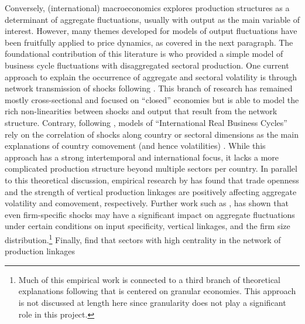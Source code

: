 Conversely, (international) macroeconomics explores production structures as a determinant of aggregate fluctuations, usually with 
output as the main variable of interest. However, many themes developed for models of output fluctuations have been fruitfully applied 
to price dynamics, as covered in the next paragraph. The foundational contribution of this literature is \textcite{long1983RealBusinessCycles} 
who provided a simple model of business cycle fluctuations with disaggregated sectoral production. One current approach to explain the 
occurrence of aggregate and sectoral volatility is through network transmission of shocks following \textcite{acemoglu2012NetworkOriginsAggregate} 
\parencite{acemoglu2016NetworksMacroeconomyEmpirical,baqaee2018CascadingFailuresProduction,chakrabarti2018DispersionMacroeconomicVolatility}.
This branch of research has remained mostly cross-sectional and focused on ``closed'' economies but is able to model the rich non-linearities 
between shocks and output that result from the network structure. Contrary, following \textcite{basu1995IntermediateGoodsBusiness}, models of 
``International Real Business Cycles'' rely on the correlation of shocks along country or sectoral dimensions as the main explanations of 
country comovement (and hence volatilities) \parencite{burstein2008TradeProductionSharing,atalayHowImportantAre2017}. While this approach 
has a strong intertemporal and international focus, it lacks a more complicated production structure beyond multiple sectors per country. 
In parallel to this theoretical discussion, empirical research by \textcite{digiovanni2009TradeOpennessVolatility, 
digiovanni2010PuttingPartsTogether} has found that trade openness and the strength of vertical production linkages are positively 
affecting aggregate volatility and comovement, respectively. Further work such as \textcite{barrotInputSpecificityPropagation2016}, 
\textcite{digiovanni2018MicroOriginsInternational} has shown that even firm-specific shocks may have a significant impact on aggregate 
fluctuations under certain conditions on input specificity, vertical linkages, and the firm size distribution.\footnote{Much of this 
empirical work is connected to a third branch of theoretical explanations following \textcite{gabaix2011GranularOriginsAggregate} that 
is centered on granular economies. This approach is not discussed at length here since granularity does not play a significant role in 
this project.} Finally, \textcite{joya2019AllSectoralShocks} find that sectors with high centrality in the network of production linkages 
